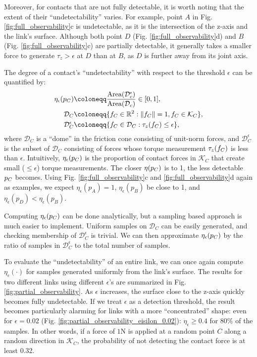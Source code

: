 Moreover, for contacts that are not fully detectable, it is worth noting that the extent of their ``undetectability'' varies. For example, point $A$ in Fig. \ref{fig:full_observability}c is undetectable, as it is the intersection of the z-axis and the link's surface. Although both point $D$ (Fig. \ref{fig:full_observability}d) and $B$ (Fig. \ref{fig:full_observability}c) are partially detectable, it generally takes a smaller force to generate $\tau_z > \epsilon$ at $D$ than at $B$, as $D$ is further away from its joint axis.

The degree of a contact's ``undetectability'' with respect to the threshold $\epsilon$ can be quantified by:
\begin{subequations}
\begin{align}
\eta_\epsilon(\pC) &\coloneqq \frac{\text{Area}(\mathcal{D}_c^\epsilon)}{\text{Area}(\mathcal{D}_c)} \in [0, 1],  \\
\mathcal{D}_C &\coloneqq \{\fC \in \mathbb{R}^2 : \norm{\fC} = 1, \fC \in \mathcal{K}_C\}, \\
\mathcal{D}_C^\epsilon &\coloneqq \{\fC \in \mathcal{D}_C : \tau_z(\fC) \leq \epsilon \}, 
\end{align}
\end{subequations}
where $\mathcal{D}_C$ is a ``dome'' in the friction cone consisting of unit-norm forces, and $\mathcal{D}_C^\epsilon$ is the subset of $\mathcal{D}_C$ consisting of forces whose torque measurement $\tau_z({f}_C)$ is less than $\epsilon$. Intuitively, $\eta_\epsilon({p}_C)$ is the proportion of contact forces in $\mathcal{K}_C$ that create small ($\leq \epsilon$) torque measurements. The closer $\eta({p}_C)$ is to 1, the less detectable ${p}_C$ becomes. Using Fig. \ref{fig:full_observability}c and \ref{fig:full_observability}d again as examples, we expect $\eta_\epsilon({p}_A) = 1$, $\eta_\epsilon({p}_B)$ be close to 1, and $\eta_\epsilon({p}_D) < \eta_\epsilon({p}_B)$. 

Computing $\eta_\epsilon({p}_C)$ can be done analytically, but a sampling based approach is much easier to implement. Uniform samples on $\mathcal{D}_C$ can be easily generated, and checking membership of $\mathcal{D}_C^\epsilon$ is trivial. We can then approximate $\eta_\epsilon({p}_C)$ by the ratio of samples in $\mathcal{D}_C^\epsilon$ to the total number of samples.

To evaluate the ``undetectability'' of an entire link, we can once again compute $\eta_\epsilon(\cdot)$ for samples generated uniformly from the link's surface. The results for two different links using different $\epsilon$'s are summarized in Fig. \ref{fig:partial_observability}. As $\epsilon$ increases, the surface close to the z-axis quickly becomes fully undetectable. If we treat $\epsilon$ as a detection threshold, the result becomes particularly alarming for links with a more ``concentrated'' shape: even for $\epsilon=0.02$ (Fig. \ref{fig:partial_observability_eisilon_0.02}): $\eta_\epsilon \geq 0.4$ for 80\% of the samples. In other words, if a force of $1\mathrm{N}$ is applied at a random point $C$ along a random direction in $\mathcal{K}_C$, the probability of not detecting the contact force is at least 0.32.

